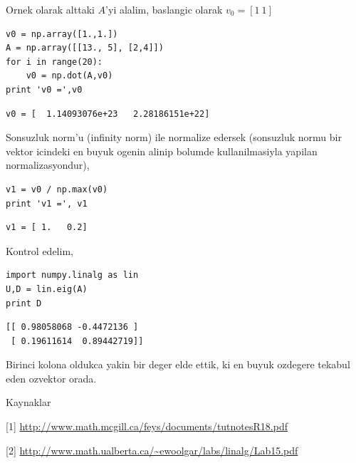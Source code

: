 \documentclass[12pt,fleqn]{article}\usepackage{../common}
\begin{document}
Ornek olarak alttaki $A$'yi alalim, baslangic olarak $v_0 = [1 \ 1]$

\begin{verbatim}
v0 = np.array([1.,1.])
A = np.array([[13., 5], [2,4]])
for i in range(20): 
    v0 = np.dot(A,v0)
print 'v0 =',v0
\end{verbatim}

\begin{verbatim}
v0 = [  1.14093076e+23   2.28186151e+22]
\end{verbatim}

Sonsuzluk norm'u (infinity norm) ile normalize edersek (sonsuzluk normu bir
vektor icindeki en buyuk ogenin alinip bolumde kullanilmasiyla yapilan
normalizasyondur), 

\begin{verbatim}
v1 = v0 / np.max(v0)
print 'v1 =', v1
\end{verbatim}

\begin{verbatim}
v1 = [ 1.   0.2]
\end{verbatim}

Kontrol edelim,

\begin{verbatim}
import numpy.linalg as lin
U,D = lin.eig(A)
print D
\end{verbatim}

\begin{verbatim}
[[ 0.98058068 -0.4472136 ]
 [ 0.19611614  0.89442719]]
\end{verbatim}

Birinci kolona oldukca yakin bir deger elde ettik, ki en buyuk ozdegere
tekabul eden ozvektor orada.

Kaynaklar

[1] \url{http://www.math.mcgill.ca/feys/documents/tutnotesR18.pdf}

[2] \url{http://www.math.ualberta.ca/~ewoolgar/labs/linalg/Lab15.pdf}
\end{document}
